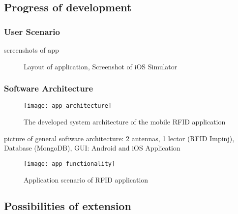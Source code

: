 \subsection{Progress of development}

\subsubsection{User Scenario}

screenshots of app

\begin{figure}
\centering
{}
\caption{Layout of application, Screenshot of iOS Simulator}
\end{figure}




\subsubsection{Software Architecture}

\begin{figure}
\centering
\texttt{[image: app\_architecture]} 
\caption{\label{fig:apparchitecture}The developed system architecture of the mobile RFID application} 
\end{figure}

picture of general software architecture: 
2 antennas, 1 lector (RFID Impinj), Database (MongoDB), GUI: Android and  iOS Application 


\begin{figure}
\centering
\texttt{[image: app\_functionality]} 
\caption{\label{fig:appfunctionality}Application scenario of RFID application } 
\end{figure}

\subsection{Possibilities of extension}

